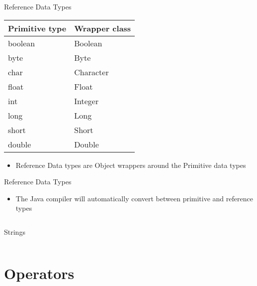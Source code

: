 \documentclass{beamer}
\begin{document}
\begin{frame}{Reference Data Types}
    \begin{table}[]
\begin{tabular}{|l|l|}
\hline
\textbf{Primitive type} & \textbf{Wrapper class} \\ \hline
boolean                 & Boolean                \\ \hline
byte                    & Byte                   \\ \hline
char                    & Character              \\ \hline
float                   & Float                  \\ \hline
int                     & Integer                \\ \hline
long                    & Long                   \\ \hline
short                   & Short                  \\ \hline
double                  & Double                 \\ \hline
\end{tabular}
\end{table}

\begin{itemize}
    \item Reference Data types are Object wrappers around the Primitive data types
\end{itemize}
\end{frame}

\begin{frame}{Reference Data Types}
\begin{itemize}
    \item The Java compiler will automatically convert between primitive and reference types
\end{itemize}

\inputminted[fontsize=\footnotesize]{java}{ReferenceDataTypes.java}

\end{frame}

\begin{frame}{Strings}
    \inputminted{java}{Strings.java}
\end{frame}

\section{Operators}
\end{document}
